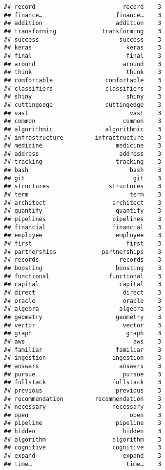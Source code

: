 \documentclass[]{article}
\begin{document}
\begin{verbatim}
## record                         record    3
## finance…                     finance…    3
## addition                     addition    3
## transforming             transforming    3
## success                       success    3
## keras                           keras    3
## final                           final    3
## around                         around    3
## think                           think    3
## comfortable               comfortable    3
## classifiers               classifiers    3
## shiny                           shiny    3
## cuttingedge               cuttingedge    3
## vast                             vast    3
## common                         common    3
## algorithmic               algorithmic    3
## infrastructure         infrastructure    3
## medicine                     medicine    3
## address                       address    3
## tracking                     tracking    3
## bash                             bash    3
## git                               git    3
## structures                 structures    3
## term                             term    3
## architect                   architect    3
## quantify                     quantify    3
## pipelines                   pipelines    3
## financial                   financial    3
## employee                     employee    3
## first                           first    3
## partnerships             partnerships    3
## records                       records    3
## boosting                     boosting    3
## functional                 functional    3
## capital                       capital    3
## direct                         direct    3
## oracle                         oracle    3
## algebra                       algebra    3
## geometry                     geometry    3
## vector                         vector    3
## graph                           graph    3
## aws                               aws    3
## familiar                     familiar    3
## ingestion                   ingestion    3
## answers                       answers    3
## pursue                         pursue    3
## fullstack                   fullstack    3
## previous                     previous    3
## recommendation         recommendation    3
## necessary                   necessary    3
## open                             open    3
## pipeline                     pipeline    3
## hidden                         hidden    3
## algorithm                   algorithm    3
## cognitive                   cognitive    3
## expand                         expand    3
## time…                           time…    3

\end{verbatim}
\end{document}
